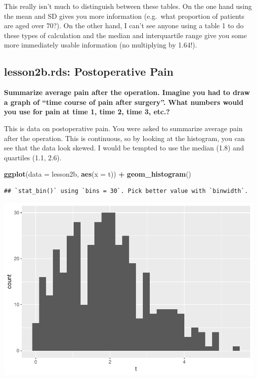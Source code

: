 \documentclass[]{book}
\newenvironment{Shaded}{\begin{snugshade}}{\end{snugshade}}
\newcommand{\DataTypeTok}[1]{\textcolor[rgb]{0.13,0.29,0.53}{#1}}
\newcommand{\KeywordTok}[1]{\textcolor[rgb]{0.13,0.29,0.53}{\textbf{#1}}}
\newcommand{\NormalTok}[1]{#1}
\newcommand{\OperatorTok}[1]{\textcolor[rgb]{0.81,0.36,0.00}{\textbf{#1}}}
\newcommand{\StringTok}[1]{\textcolor[rgb]{0.31,0.60,0.02}{#1}}
\begin{document}
This really isn't much to distinguish between these tables. On the one hand using the mean and SD gives you more information (e.g.~what proportion of patients are aged over 70?). On the other hand, I can't see anyone using a table 1 to do these types of calculation and the median and interquartile range give you some more immediately usable information (no multiplying by 1.64!).

\hypertarget{lesson2b.rds-postoperative-pain}{%
\subsection{lesson2b.rds: Postoperative Pain}\label{lesson2b.rds-postoperative-pain}}

\textbf{Summarize average pain after the operation. Imagine you had to draw a graph of ``time course of pain after surgery''. What numbers would you use for pain at time 1, time 2, time 3, etc.?}

This is data on postoperative pain. You were asked to summarize average pain after the operation. This is continuous, so by looking at the histogram, you can see that the data look skewed. I would be tempted to use the median (1.8) and quartiles (1.1, 2.6).

\begin{Shaded}
\begin{Highlighting}[]
\KeywordTok{ggplot}\NormalTok{(}\DataTypeTok{data =}\NormalTok{ lesson2b,}
       \KeywordTok{aes}\NormalTok{(}\DataTypeTok{x =}\NormalTok{ t)) }\OperatorTok{+}
\StringTok{  }\KeywordTok{geom_histogram}\NormalTok{()}
\end{Highlighting}
\end{Shaded}

\begin{verbatim}
## `stat_bin()` using `bins = 30`. Pick better value with `binwidth`.
\end{verbatim}

\includegraphics{09-answers_files/figure-latex/week2d-1.pdf}
\end{document}
